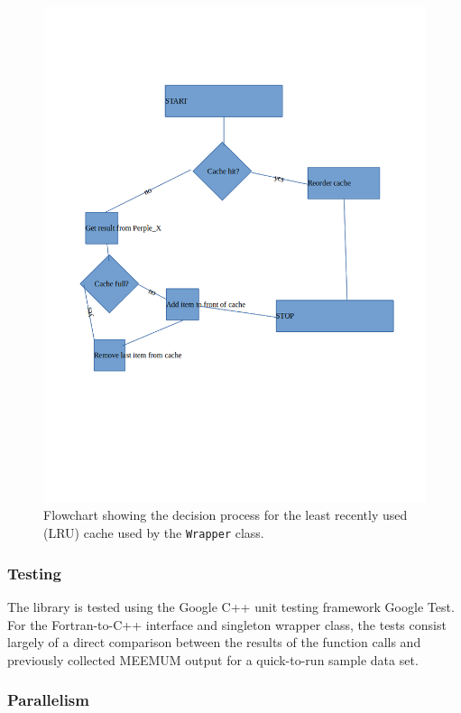 \begin{figure}[ht]
    \centering
    \includegraphics[width=\columnwidth]{./figures/cache_flowchart.png}
    \caption{Flowchart showing the decision process for the least recently used (LRU) cache used by the \texttt{Wrapper} class.}
    \label{fig:cache_flowchart}
\end{figure}

\subsubsection{Testing}

The library is tested using the Google C++ unit testing framework Google Test.
For the Fortran-to-C++ interface and singleton wrapper class, the tests consist largely of a direct comparison between the results of the function calls and previously collected MEEMUM output for a quick-to-run sample data set.

\subsubsection{Parallelism}

